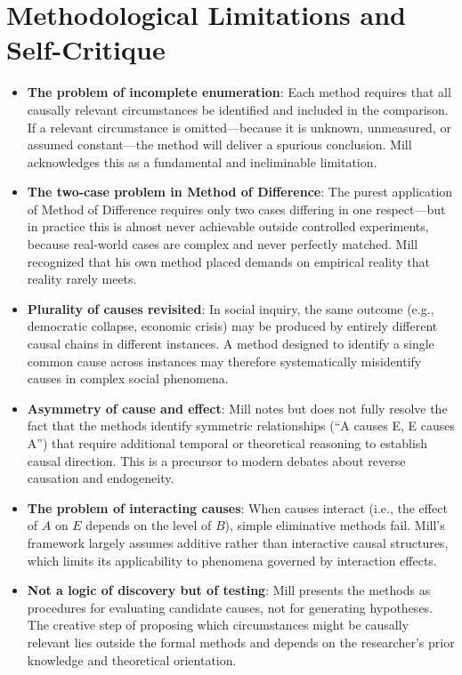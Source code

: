 \documentclass[12pt]{article}
\begin{document}
\section{Methodological Limitations and Self-Critique}

\begin{itemize}[leftmargin=*, itemsep=4pt]
    \item \textbf{The problem of incomplete enumeration}: Each method requires that all causally relevant circumstances be identified and included in the comparison. If a relevant circumstance is omitted---because it is unknown, unmeasured, or assumed constant---the method will deliver a spurious conclusion. Mill acknowledges this as a fundamental and ineliminable limitation.
    \item \textbf{The two-case problem in Method of Difference}: The purest application of Method of Difference requires only two cases differing in one respect---but in practice this is almost never achievable outside controlled experiments, because real-world cases are complex and never perfectly matched. Mill recognized that his own method placed demands on empirical reality that reality rarely meets.
    \item \textbf{Plurality of causes revisited}: In social inquiry, the same outcome (e.g., democratic collapse, economic crisis) may be produced by entirely different causal chains in different instances. A method designed to identify a single common cause across instances may therefore systematically misidentify causes in complex social phenomena.
    \item \textbf{Asymmetry of cause and effect}: Mill notes but does not fully resolve the fact that the methods identify symmetric relationships (``A causes E, E causes A'') that require additional temporal or theoretical reasoning to establish causal direction. This is a precursor to modern debates about reverse causation and endogeneity.
    \item \textbf{The problem of interacting causes}: When causes interact (i.e., the effect of $A$ on $E$ depends on the level of $B$), simple eliminative methods fail. Mill's framework largely assumes additive rather than interactive causal structures, which limits its applicability to phenomena governed by interaction effects.
    \item \textbf{Not a logic of discovery but of testing}: Mill presents the methods as procedures for evaluating candidate causes, not for generating hypotheses. The creative step of proposing which circumstances might be causally relevant lies outside the formal methods and depends on the researcher's prior knowledge and theoretical orientation.
\end{itemize}
\end{document}
